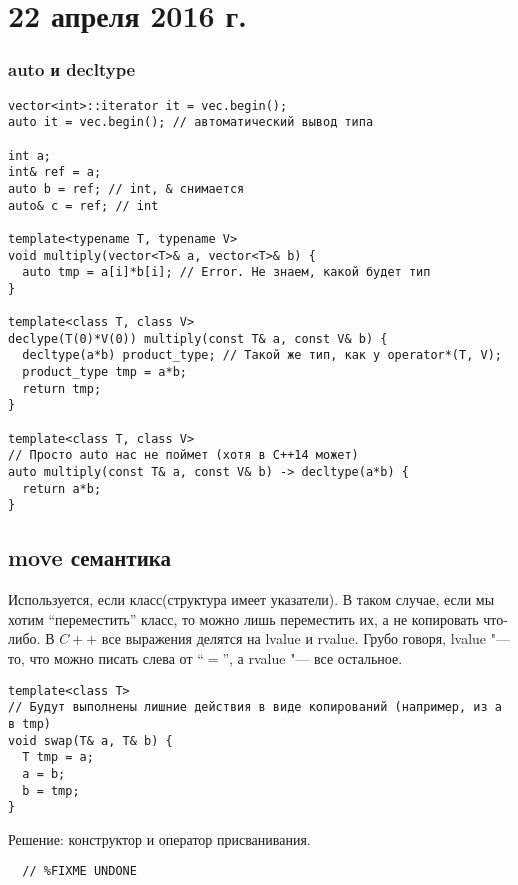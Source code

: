 \section{22 апреля 2016 г.}

\subsubsection{auto и decltype}
\begin{verbatim}
vector<int>::iterator it = vec.begin();
auto it = vec.begin(); // автоматический вывод типа

int a;
int& ref = a;
auto b = ref; // int, & снимается
auto& c = ref; // int

template<typename T, typename V>
void multiply(vector<T>& a, vector<T>& b) {
  auto tmp = a[i]*b[i]; // Error. Не знаем, какой будет тип
}

template<class T, class V>
declype(T(0)*V(0)) multiply(const T& a, const V& b) {
  decltype(a*b) product_type; // Такой же тип, как у operator*(T, V);
  product_type tmp = a*b;
  return tmp;
}

template<class T, class V>
// Просто auto нас не поймет (хотя в C++14 может)
auto multiply(const T& a, const V& b) -> decltype(a*b) {
  return a*b;
}
\end{verbatim}

\subsection{move семантика}
Используется, если класс(структура имеет указатели). В таком случае, если мы хотим ``переместить'' класс, то можно лишь переместить их, а не копировать что-либо.
В $C++$ все выражения делятся на lvalue и rvalue. Грубо говоря, lvalue "--- то, что можно писать слева от ``$=$'', а rvalue "--- все остальное.
\begin{verbatim}
template<class T>
// Будут выполнены лишние действия в виде копирований (например, из a в tmp)
void swap(T& a, T& b) {
  T tmp = a;
  a = b;
  b = tmp;
}
\end{verbatim}
Решение: конструктор и оператор присванивания.
\begin{verbatim}
  // %FIXME UNDONE
\end{verbatim}
